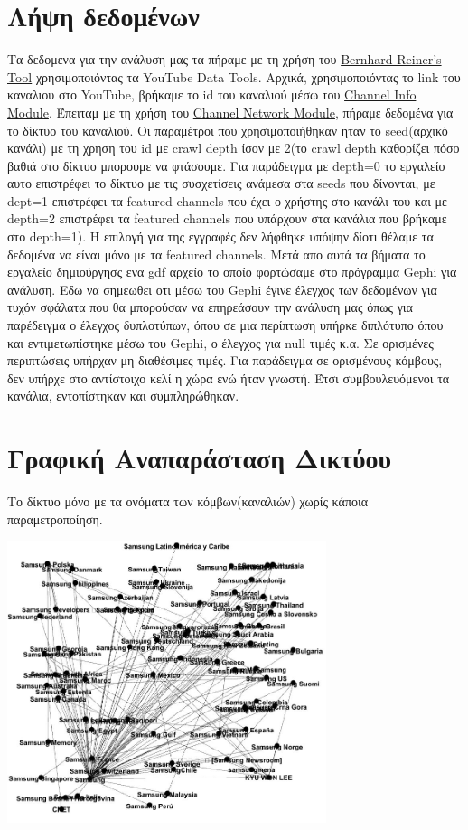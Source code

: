 \documentclass[12pt]{article}
\begin{document}
	\section{Λήψη δεδομένων}
	Τα δεδομενα για την ανάλυση μας τα πήραμε με τη χρήση του \href{https://labs.polsys.net}{Bernhard Reiner's Tool} χρησιμοποιόντας τα YouTube Data Tools. Αρχικά, χρησιμοποιόντας το link του καναλιου στο YouTube, βρήκαμε το id του καναλιού μέσω του  \href{https://ytdt.digitalmethods.net/mod_channel_info.php}{Channel Info Module}. Έπειταμ με τη χρήση του \href{https://ytdt.digitalmethods.net/mod_channel_info.php}{Channel Network Module}, πήραμε δεδομένα για το δίκτυο του καναλιού. Οι παραμέτροι που χρησιμοποιήθηκαν ηταν το seed(αρχικό κανάλι) με τη χρηση του id με crawl depth ίσον με 2(το crawl depth καθορίζει πόσο βαθιά στο δίκτυο μπορουμε να φτάσουμε. Για παράδειγμα με depth=0 το εργαλείο αυτο επιστρέφει το δίκτυο με τις συσχετίσεις ανάμεσα στα seeds που δίνονται, με dept=1 επιστρέφει τα featured channels που έχει ο χρήστης στο κανάλι του και με depth=2 επιστρέφει τα featured channels που υπάρχουν στα κανάλια που βρήκαμε στο depth=1). Η επιλογή για της εγγραφές δεν λήφθηκε υπόψην δίοτι θέλαμε τα δεδομένα να είναι μόνο με τα featured channels. Μετά απο αυτά τα βήματα το εργαλείο δημιούργησς ενα gdf αρχείο το οποίο φορτώσαμε στο πρόγραμμα Gephi για ανάλυση. Εδω να σημεωθει οτι μέσω του Gephi έγινε έλεγχος των δεδομένων για τυχόν σφάλατα που θα μπορούσαν να επηρεάσουν την ανάλυση μας όπως για παρέδειγμα ο έλεγχος δυπλοτύπων, όπου σε μια περίπτωση υπήρκε διπλότυπο όπου και εντιμετωπίστηκε μέσω του Gephi, ο έλεγχος για null τιμές κ.α. Σε ορισμένες περιπτώσεις υπήρχαν μη διαθέσιμες τιμές. Για παράδειγμα σε ορισμένους κόμβους, δεν υπήρχε στο αντίστοιχο κελί η χώρα ενώ ήταν γνωστή. Έτσι συμβουλευόμενοι τα κανάλια, εντοπίστηκαν και συμπληρώθηκαν.
	\label{chap:data_fetching_2}
	
	
	\section{Γραφική Αναπαράσταση Δικτύου}
	Το δίκτυο μόνο με τα ονόματα των κόμβων(καναλιών) χωρίς κάποια παραμετροποίηση.
		\begin{center}
			\includegraphics[width=0.7\textwidth]{photos-files/section3/first_painting.jpg}
		\end{center}
	\newpage
	
\end{document}
